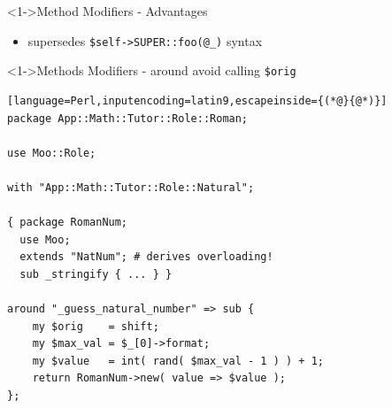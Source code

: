 \documentclass[ngerman,xcolor={table,dvipsnames},scriptsizeer,compress,hyperref={bookmarks,colorlinks}]{beamer}
\begin{document}
\begin{frame}[t,fragile]

\begin{block}<1->{Method Modifiers - Advantages}
\begin{itemize}
\item supersedes \texttt{\$self->SUPER::foo(@\_)} syntax
\end{itemize}
\end{block}

\end{frame}

\begin{frame}[fragile]

\begin{block}<1->{Methods Modifiers - around avoid calling \texttt{\$orig}}
\scriptsize
\begin{lstlisting}[language=Perl,inputencoding=latin9,escapeinside={(*@}{@*)}]
package App::Math::Tutor::Role::Roman;

use Moo::Role;

with "App::Math::Tutor::Role::Natural";

{ package RomanNum;
  use Moo;
  extends "NatNum"; # derives overloading!
  sub _stringify { ... } }

around "_guess_natural_number" => sub {
    my $orig    = shift;
    my $max_val = $_[0]->format;
    my $value   = int( rand( $max_val - 1 ) ) + 1;
    return RomanNum->new( value => $value );
};
\end{lstlisting}
\end{block}

\begin{itemize}
\end{itemize}

\end{frame}
\end{document}
